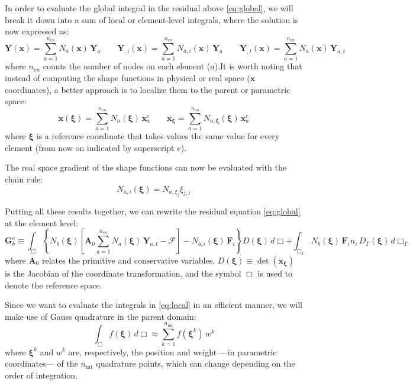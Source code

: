 \documentclass{ucb}
\begin{document}
In order to evaluate the global integral in the residual above \eqref{eq:global}, we will break it down into a sum of local or element-level integrals, where the solution is now expressed as:
\begin{equation}
    \bm{Y}(\bm{x}) = \sum_{a = 1}^{n_{en}} N_a(\bm{x})\,\bm{Y}_a \qquad \bm{Y}_{,i}(\bm{x}) = \sum_{a = 1}^{n_{en}} N_{a,i}(\bm{x})\,\bm{Y}_a \qquad \bm{Y}_{,t}(\bm{x}) = \sum_{a = 1}^{n_{en}} N_a(\bm{x})\,\bm{Y}_{a,t}
\end{equation}
where $n_{en}$ counts the number of nodes on each element ($a$).It is worth noting that instead of computing the shape functions in physical or real space ($\bm{x}$ coordinates), a better approach is to localize them to the parent or parametric space:
\begin{equation}
    \bm{x}(\bm{\xi}) = \sum_{a = 1}^{n_{en}} N_a(\bm{\xi})\,\bm{x}_a^e \qquad \bm{x}_{\bm{\xi}} = \sum_{a = 1}^{n_{en}} N_{a,\bm{\xi}}(\bm{\xi})\,\bm{x}_a^e
\end{equation}
where $\bm{\xi}$ is a reference coordinate that takes values the same value for every element (from now on indicated by superscript $e$).

The real space gradient of the shape functions can now be evaluated with the chain rule:
\begin{equation}
    N_{a,i}(\bm{\xi}) = N_{a,\xi_j}\xi_{j,i}
    \label{eq:chainrule}
\end{equation}

Putting all these results together, we can rewrite the residual equation \eqref{eq:global} at the element level:
\begin{equation}
    \bm{G}_b^e \equiv \int_\Box \left\{N_b(\bm{\xi})\left[\bm{A}_0\sum_{a = 1}^{n_{en}} N_a(\bm{\xi})\,\bm{Y}_{a,t} - \bm{\mathcal{F}}\right] - N_{b,i}(\bm{\xi})\,\bm{F}_i\right\} D(\bm{\xi}) \, d\Box + \int_{\Box_\Gamma} N_b(\bm{\xi})\,\bm{F}_i n_i \, D_\Gamma(\bm{\xi}) \, d\Box_\Gamma
    \label{eq:local}
\end{equation}
where $\bm{A}_0$ relates the primitive and conservative variables, $D(\bm{\xi}) \equiv \det(\bm{x}_{\bm{\xi}})$ is the Jacobian of the coordinate transformation, and the symbol $\Box$ is used to denote the reference space.

Since we want to evaluate the integrals in \autoref{eq:local} in an efficient manner, we will make use of Gauss quadrature in the parent domain:
\begin{equation}
    \int_\Box f(\bm{\xi}) \, d\Box \approx \sum_{k = 1}^{n_\mathrm{int}} f(\bm{\xi}^k) \, w^k
\end{equation}
where $\bm{\xi}^k$ and $w^k$ are, respectively, the position and weight ---in parametric coordinates--- of the $n_\mathrm{int}$ quadrature points, which can change depending on the order of integration.
\end{document}
